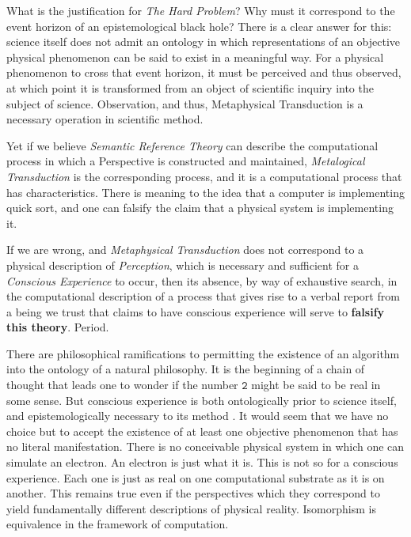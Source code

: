 \documentclass[runningheads]{llncs}
\begin{document}
What is the justification for \emph{The Hard Problem}? Why must it correspond to the event horizon of an epistemological black hole? There is a clear answer for this: science itself does not admit an ontology in which representations of an objective physical phenomenon can be said to exist in a meaningful way. For a physical phenomenon to cross that event horizon, it must be perceived and thus observed, at which point it is transformed from an object of scientific inquiry into the subject of science. Observation, and thus, Metaphysical Transduction is a necessary operation in scientific method\cite{Popper1959}.

Yet if we believe \emph{Semantic Reference Theory} can describe the computational process in which a Perspective is constructed and maintained, \emph{Metalogical Transduction} is the corresponding process, and it is a computational process that has characteristics. There is meaning to the idea that a computer is implementing quick sort, and one can falsify the claim that a physical system is implementing it.

If we are wrong, and \emph{Metaphysical Transduction} does not correspond to a physical description of \emph{Perception}, which is necessary and sufficient for a \emph{Conscious Experience} to occur, then its absence, by way of exhaustive search, in the computational description of a process that gives rise to a verbal report from a being we trust that claims to have conscious experience will serve to \textbf{falsify this theory}. Period.

There are philosophical ramifications to permitting the existence of an algorithm into the ontology of a natural philosophy. It is the beginning of a chain of thought that leads one to wonder if the number $\texttt{2}$ might be said to be real in some sense. But conscious experience is both ontologically prior to science itself, and epistemologically necessary to its method \cite{Chalmers1996} \cite{KantSynthetic}. It would seem that we have no choice but to accept the existence of at least one objective phenomenon that has no literal manifestation. There is no conceivable physical system in which one can simulate an electron. An electron is just what it is. This is not so for a conscious experience. Each one is just as real on one computational substrate as it is on another. This remains true even if the perspectives which they correspond to yield fundamentally different descriptions of physical reality. Isomorphism is equivalence in the framework of computation.
\end{document}
